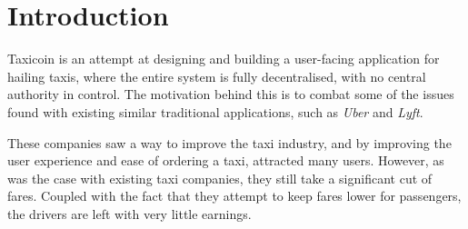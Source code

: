 \section{Introduction}

Taxicoin is an attempt at designing and building a user-facing application for hailing taxis, where the entire system is fully decentralised, with no central authority in control. The motivation behind this is to combat some of the issues found with existing similar traditional applications, such as \textit{Uber} and \textit{Lyft}.

These companies saw a way to improve the taxi industry, and by improving the user experience and ease of ordering a taxi, attracted many users. However, as was the case with existing taxi companies, they still take a significant cut of fares. Coupled with the fact that they attempt to keep fares lower for passengers, the drivers are left with very little earnings.

